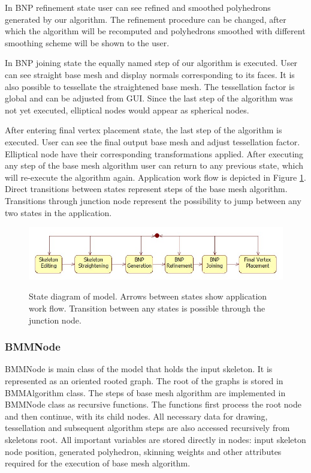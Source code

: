 In BNP refinement state user can see refined and smoothed polyhedrons generated by our algorithm.
The refinement procedure can be changed, after which the algorithm will be recomputed and polyhedrons smoothed with different smoothing scheme will be shown to the user.

In BNP joining state the equally named step of our algorithm is executed.
User can see straight base mesh and display normals corresponding to its faces.
It is also possible to tessellate the straightened base mesh.
The tessellation factor is global and can be adjusted from GUI.
Since the last step of the algorithm was not yet executed, elliptical nodes would appear as spherical nodes.

After entering final vertex placement state, the last step of the algorithm is executed.
User can see the final output base mesh and adjust tessellation factor.
Elliptical node have their corresponding transformations applied.
After executing any step of the base mesh algorithm user can return to any previous state, which will re-execute the algorithm again.
Application work flow is depicted in Figure \ref{fig:states}.
Direct transitions between states represent steps of the base mesh algorithm.
Transitions through junction node represent the possibility to jump between any two states in the application.

\begin{figure}[h]
    \centering
    \includegraphics[width=\textwidth]{images/states}
    \label{fig:states}
    \caption[Model state diagram]{State diagram of model. Arrows between states show application work flow. Transition between any states is possible through the junction node.}
\end{figure}

\subsubsection{BMMNode}

BMMNode is main class of the model that holds the input skeleton.
It is represented as an oriented rooted graph.
The root of the graphs is stored in BMMAlgorithm class.
The steps of base mesh algorithm are implemented in BMMNode class as recursive functions.
The functions first process the root node and then continue, with its child nodes.
All necessary data for drawing, tessellation and subsequent algorithm steps are also accessed recursively from skeletons root. All important variables are stored directly in nodes: input skeleton node position, generated polyhedron, skinning weights and other attributes required for the execution of base mesh algorithm.

